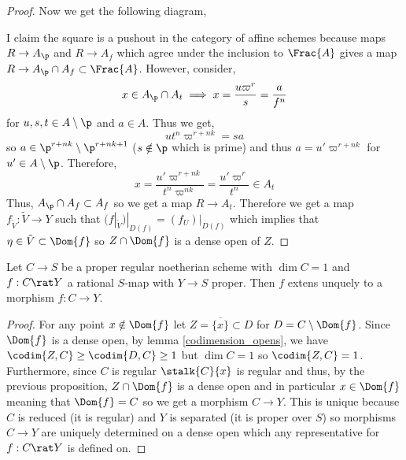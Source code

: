 \documentclass[12pt]{article}
\begin{document}
\begin{proof}
Now we get the following diagram, 
\begin{center}
\end{center}
I claim the square is a pushout in the category of affine schemes because maps $R \to A_\p$ and $R \to A_f$ which agree under the inclusion to $\Frac{A}$ gives a map $R \to A_\p \cap A_f \subset \Frac{A}$. However, consider,
\[ x \in A_\p \cap A_t \implies x = \frac{u \varpi^r}{s} = \frac{a}{f^n} \]
for $u, s, t \in A \setminus \p$ and $a \in A$. Thus we get,
\[ u t^n \varpi^{r + nk} = s a \]
so $a \in \p^{r + nk} \setminus \p^{r + nk + 1}$ ($s \notin \p$ which is prime) and thus $a = u' \varpi^{r + nk}$ for $u' \in A \setminus \p$. Therefore,
\[ x = \frac{u' \varpi^{r + nk}}{t^n \varpi^{nk}} = \frac{u' \varpi^{r}}{t^n} \in A_t \]
Thus, $A_\p \cap A_f \subset A_f$ so we get a map $R \to A_t$. Therefore we get a map $f_{\tilde{V}} : \tilde{V} \to Y$ such that $(f|_{\tilde{V}})|_{D(f)} = (f_U)|_{D(f)}$ which implies that $\eta \in \tilde{V} \subset \Dom{f}$ so $Z \cap \Dom{f}$ is a dense open of $Z$. 
\end{proof}

\begin{prop}
Let $C \to S$ be a proper regular noetherian scheme with $\dim{C} = 1$ and $f : C \rat Y$ a rational $S$-map with $Y \to S$ proper. Then $f$ extens unquely to a morphism $f : C \to Y$. 
\end{prop}

\begin{proof}
For any point $x \notin \Dom{f}$ let $Z = \overline{\{ x \}} \subset D$ for $D = C \setminus \Dom{f}$. Since $\Dom{f}$ is a dense open, by lemma \ref{codimension_opens}, we have $\codim{Z, C} \ge \codim{D, C} \ge 1$ but $\dim{C} = 1$ so $\codim{Z, C} = 1$. Furthermore, since $C$ is regular $\stalk{C}{x}$ is regular and thus, by the previous proposition, $Z \cap \Dom{f}$ is a dense open and in particular $x \in \Dom{f}$ meaning that $\Dom{f} = C$ so we get a morphism $C \to Y$. This is unique because $C$ is reduced (it is regular) and $Y$ is separated (it is proper over $S$) so morphisms $C \to Y$ are uniquely determined on a dense open which any representative for $f : C \rat Y$ is defined on.   
\end{proof}
\end{document}
